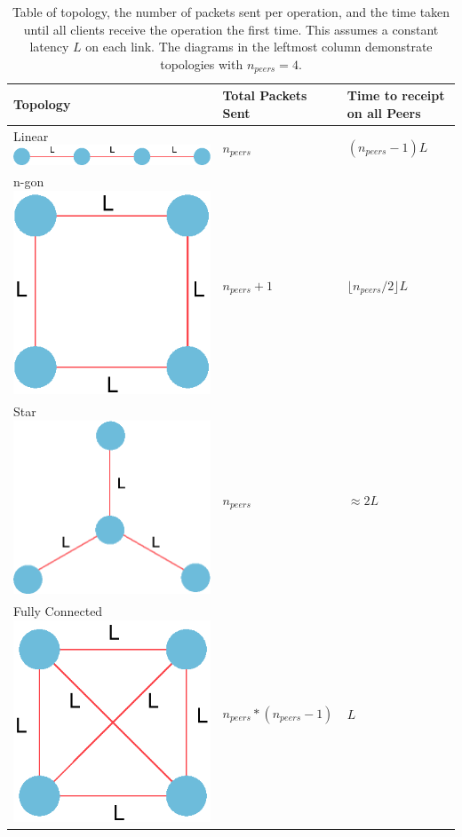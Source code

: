 \documentclass[12pt,a4paper,twoside,openright]{report}
\begin{document}
			\begin{table}[htb]
			\centering
			\caption[Number of Packets in P2P Network] {Table of topology, the number of packets sent per operation, and the time taken until all clients receive the operation the first time. This assumes a constant latency $L$ on each link. The diagrams in the leftmost column demonstrate topologies with $n_{peers}=4$.}
			\label{tab:topologypackets}
			\setlength{\tabcolsep}{12pt}
			\begin{tabular}{@{}lll@{}}
			Topology		& Total Packets Sent            & Time to receipt on all Peers   \\ \toprule
			\makecell{Linear \\ \includegraphics[width=0.2\linewidth]{figs/linear_top.eps}  }        & $n_{peers}$                   & $(n_{peers}-1)L$              \\ \midrule
			\makecell{n-gon  \\ \includegraphics[width=0.2\linewidth]{figs/ngon_top.eps} }        & $n_{peers}+1$                 & $\lfloor n_{peers}/2 \rfloor L$ \\ \midrule
			\makecell{Star  \\ \includegraphics[width=0.2\linewidth]{figs/star.eps} }         & $n_{peers}$ 	                & $\approx 2L$                           \\ \midrule
			\makecell{Fully Connected  \\ \includegraphics[width=0.2\linewidth]{figs/fullyconnected.eps} } & $n_{peers} * (n_{peers} - 1)$ & $L$                 \\ \bottomrule          
			\end{tabular}
			\end{table}
			
\end{document}
